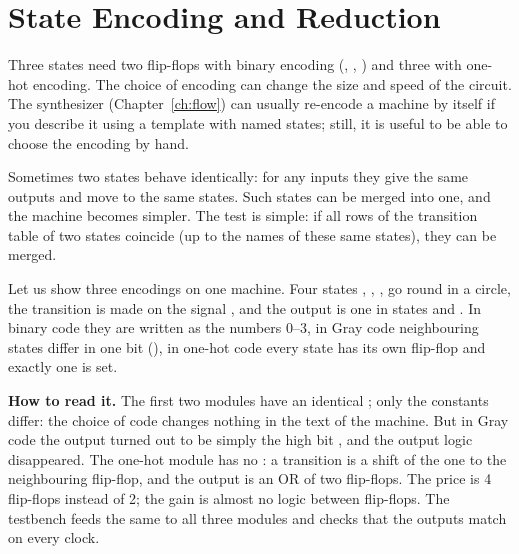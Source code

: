 \section{State Encoding and Reduction}

Three states need two flip-flops with binary encoding
(, , ) and three with one-hot encoding. The choice
of encoding can change the size and speed of the circuit. The
synthesizer (Chapter~\ref{ch:flow}) can usually re-encode a machine by itself
if you describe it using a template with named states; still, it is useful to
be able to choose the encoding by hand.

Sometimes two states behave identically: for any inputs they give the same
outputs and move to the same states. Such states can be merged into one, and
the machine becomes simpler. The test is simple: if all rows of the transition
table of two states coincide (up to the names of these same states), they can
be merged.

Let us show three encodings on one machine. Four states , ,
,  go round in a circle, the transition is made on the signal
, and the output  is one in states  and . In
binary code they are written as the numbers 0--3, in Gray code neighbouring
states differ in one bit (), in one-hot code every state
has its own flip-flop and exactly one is set.


\textbf{How to read it.} The first two modules have an identical ;
only the constants  differ: the choice of code changes nothing in
the text of the machine. But in Gray code the output turned out to be simply the
high bit , and the output logic disappeared. The one-hot module has
no : a transition is a shift of the one to the neighbouring
flip-flop, and the output is an OR of two flip-flops. The price is 4
flip-flops instead of 2; the gain is almost no logic between flip-flops. The
testbench  feeds the same  to all three modules
and checks that the outputs match on every clock.

